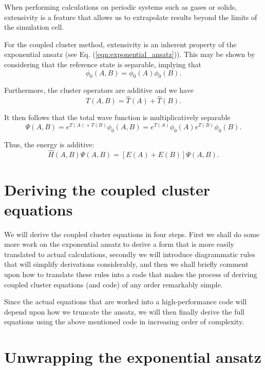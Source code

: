 When performing calculations on periodic systems such as gases or
solids, extensivity is a feature that allows us to extrapolate results
beyond the limits of the simulation cell.

For the coupled cluster method, extensivity is an inherent property of
the exponential ansatz (see Eq. (\ref{eqn:exponential_ansatz})). This may be shown
by considering that the reference state is separable, implying that
\begin{equation}
\phi_0(A,B) = \phi_0(A)\phi_0(B).
\end{equation}

Furthermore, the cluster operators are additive and we have
\begin{equation}
\hat{T}(A,B) = \hat{T}(A) + \hat{T}(B) .
\end{equation}

It then follows that the total wave function is multiplicatively separable
\begin{equation}
\Psi(A,B) = e^{T(A) + T(B)}\phi_0(A,B) = e^{T(A)}\phi_0(A)e^{T(B)}\phi_0(B).
\end{equation}

Thus, the energy is additive:
\begin{equation}
\hat{H}(A,B)\Psi(A,B) = [E(A) + E(B)]\Psi(A,B).
\end{equation}


\section{Deriving the coupled cluster equations}

We will derive the coupled cluster equations in four steps. First we
shall do some more work on the exponential ansatz to derive a form
that is more easily translated to actual calculations, secondly we
will introduce diagrammatic rules that will simplify derivations
considerably, and then we shall briefly comment upon how to translate
these rules into a code that makes the process of deriving coupled
cluster equations (and code) of any order remarkably simple.

Since the actual equations that are worked into a high-performance code
will depend upon how we truncate the ansatz, we will then finally
derive the full equations using the above mentioned code in increasing
order of complexity.

\section{Unwrapping the exponential ansatz}

